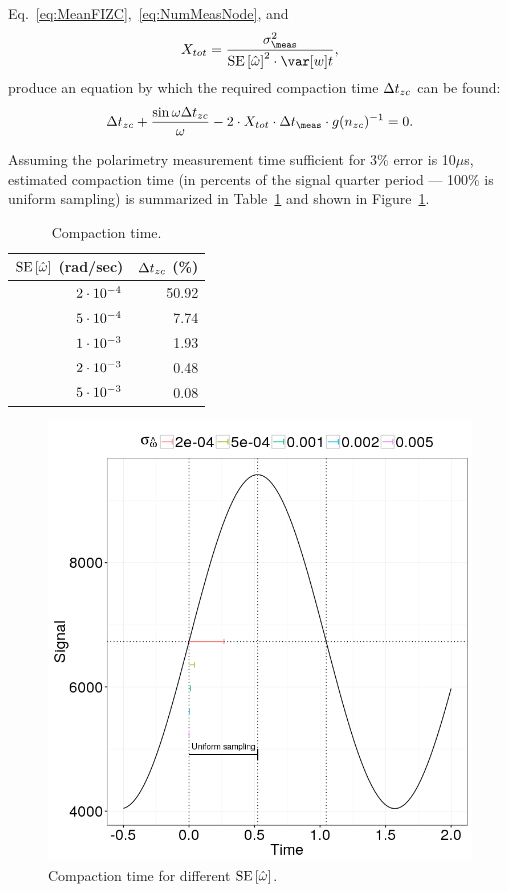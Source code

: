\documentclass{article}
\begin{document}
Eq.~\eqref{eq:MeanFIZC},~\eqref{eq:NumMeasNode}, and
\[
	\stat* = \stat,
\]
produce an equation by which the required compaction time $\Delta t_{zc}$ can be found:
\begin{equation}\label{eq:CmpTEq}
	\dtnd + \frac{\sin\omega\dtnd}{\omega} - 2\cdot \stat* \cdot\dtm \cdot g(\Nnd)^{-1}= 0.
\end{equation}

Assuming the polarimetry measurement time sufficient for 3\% error is 10$\mu$s, estimated compaction time (in percents of the signal quarter period --- 100\% is uniform sampling) is summarized in Table~\ref{tbl:CmpTvsSEw} and shown in Figure~\ref{fig:CmpTvsSEw}.

\begin{table}[h]
	\centering
	\caption{Compaction time.\label{tbl:CmpTvsSEw}}
	\begin{tabular}{rr}
		\hline
		$\SE{\hat{\omega}}$ (rad/sec) & $\Delta t_{zc}$ (\%) \\ \hline
		${2}\cdot 10^{-4}$ &        50.92 \\
		${5}\cdot 10^{-4}$ &         7.74 \\
		${1}\cdot 10^{-3}$ &         1.93 \\
		${2}\cdot 10^{-3}$ &         0.48 \\
		${5}\cdot 10^{-3}$ &         0.08 \\ \hline
	\end{tabular}
\end{table}

\begin{figure}[h]
	\centering
	\includegraphics[scale=.5]{img/StatReq/CmpTvsSEw}
	\caption{Compaction time for different $\SE{\hat{\omega}}$.\label{fig:CmpTvsSEw}}
\end{figure}
\end{document}
